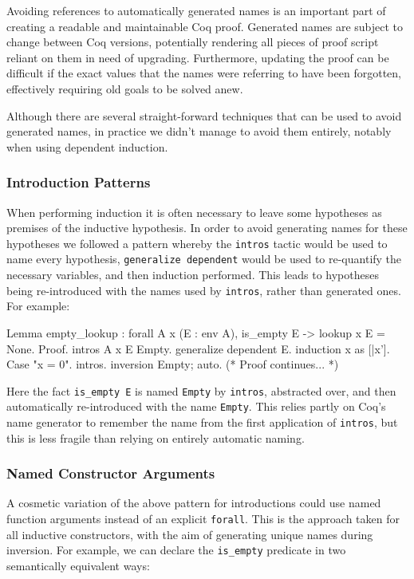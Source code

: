 \documentclass[]{unswthesis}
\let\c\texttt
\begin{document}
Avoiding references to automatically generated names is an important part of creating a readable and maintainable Coq proof. Generated names are subject to change between Coq versions, potentially rendering all pieces of proof script reliant on them in need of upgrading. Furthermore, updating the proof can be difficult if the exact values that the names were referring to have been forgotten, effectively requiring old goals to be solved anew.

Although there are several straight-forward techniques that can be used to avoid generated names, in practice we didn't manage to avoid them entirely, notably when using dependent induction.

\subsubsection{Introduction Patterns}

When performing induction it is often necessary to leave some hypotheses as premises of the inductive hypothesis. In order to avoid generating names for these hypotheses we followed a pattern whereby the \c{intros} tactic would be used to name every hypothesis, \c{generalize dependent} would be used to re-quantify the necessary variables, and then induction performed. This leads to hypotheses being re-introduced with the names used by \c{intros}, rather than generated ones. For example:

\begin{coqcode}
Lemma empty_lookup : forall A x (E : env A), is_empty E ->
  lookup x E = None.
Proof.
  intros A x E Empty.
  generalize dependent E.
  induction x as [|x'].
  Case "x = 0".
    intros. inversion Empty; auto.
  (* Proof continues... *)
\end{coqcode}

Here the fact \c{is_empty E} is named \c{Empty} by \c{intros}, abstracted over, and then automatically re-introduced with the name \c{Empty}. This relies partly on Coq's name generator to remember the name from the first application of \c{intros}, but this is less fragile than relying on entirely automatic naming.

\subsubsection{Named Constructor Arguments}

A cosmetic variation of the above pattern for introductions could use named function arguments instead of an explicit \c{forall}. This is the approach taken for all inductive constructors, with the aim of generating unique names during inversion. For example, we can declare the \c{is_empty} predicate in two semantically equivalent ways:
\end{document}
